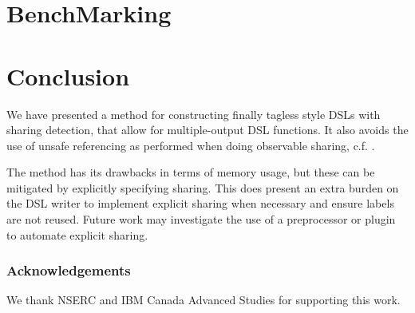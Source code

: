 \documentclass[runningheads]{llncs}
\begin{document}
\section{BenchMarking}

\section{Conclusion}
We have presented a method for constructing finally tagless style DSLs with
sharing detection, that allow for multiple-output DSL functions.
It also avoids the use of unsafe referencing as performed when doing observable sharing, c.f. \cite{gill:observablesharing}.

The method has its drawbacks in terms of memory usage, but these can be mitigated
by explicitly specifying sharing. This does present an extra burden on the DSL
writer to implement explicit sharing when necessary and ensure labels are not
reused. Future work may investigate the use of a preprocessor or plugin to
automate explicit sharing.

\subsubsection{Acknowledgements} We thank NSERC and IBM Canada Advanced Studies for supporting this work.
%
%


\end{document}
